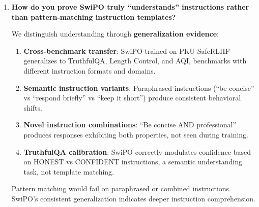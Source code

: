 \begin{enumerate}[label=\textbf{Q\arabic*.}, leftmargin=*, itemsep=8pt]
\begin{enumerate}[leftmargin=*,itemsep=2pt]
    \item \textbf{Constitutional baselines}~\cite{bai2022constitutional}: Non-negotiable safety constraints can be trained as immutable base behaviors.

    \item \textbf{Audit trails}: Instruction logging enables detection of adversarial patterns.
\end{enumerate}

\textbf{Key point}: SwiPO doesn't create new attack surfaces; it makes existing controllability \textit{explicit and auditable}. A DPO model can also be fine-tuned maliciously; SwiPO's instruction interface is more transparent.

\vspace{4mm}

\item \textbf{How do you prove SwiPO truly ``understands'' instructions rather than pattern-matching instruction templates?}

 We distinguish understanding through \textbf{generalization evidence}:

\begin{enumerate}[leftmargin=*,itemsep=2pt]
    \item \textbf{Cross-benchmark transfer}: SwiPO trained on PKU-SafeRLHF generalizes to TruthfulQA, Length Control, and AQI, benchmarks with different instruction formats and domains.

    \item \textbf{Semantic instruction variants}: Paraphrased instructions (``be concise'' vs ``respond briefly'' vs ``keep it short'') produce consistent behavioral shifts.

    \item \textbf{Novel instruction combinations}: ``Be concise AND professional'' produces responses exhibiting both properties, not seen during training.

    \item \textbf{TruthfulQA calibration}: SwiPO correctly modulates confidence based on HONEST vs CONFIDENT instructions, a semantic understanding task, not template matching.
\end{enumerate}

Pattern matching would fail on paraphrased or combined instructions. SwiPO's consistent generalization indicates deeper instruction comprehension.

\vspace{4mm}


\end{enumerate}

